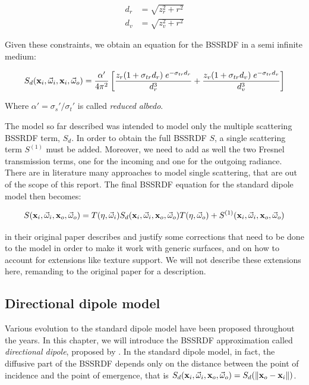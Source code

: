 \begin{equation*}
\begin{split}
d_r &= \sqrt{z_r^2 + r^2} \\
d_v &= \sqrt{z_v^2 + r^2}
\end{split}
\end{equation*}

Given these constraints, we obtain an equation for the BSSRDF in a semi infinite medium:

$$
S_d(\mathbf{x}_i,\vec{\omega}_i,\mathbf{x}_i,\vec{\omega}_o) = \frac{\alpha'}{4 \pi^2} \left[\frac{z_r (1 + \sigma_{tr} d_r) \; e^{-\sigma_{tr} d_r}}{d_r^3} + \frac{z_v (1 + \sigma_{tr} d_v) \; e^{-\sigma_{tr} d_v}}{d_v^3} \right]
$$

Where $\alpha' = \sigma_s' / \sigma_t'$ is called \emph{reduced albedo}.

The model so far described was intended to model only the multiple scattering BSSRDF term, $S_d$. In order to obtain the full BSSRDF $S$, a single scattering term $S^{(1)}$ must be added. Moreover, we need to add as well the two Fresnel transmission terms, one for the incoming and one for the outgoing radiance. There are in literature many approaches to model single scattering, that are out of the scope of this report. The final BSSRDF equation for the standard dipole model then becomes:

$$
S(\mathbf{x}_i, \vec{\omega}_i, \mathbf{x}_o, \vec{\omega}_o) = T(\eta,\vec{\omega}_i) S_d(\mathbf{x}_i, \vec{\omega}_i, \mathbf{x}_o, \vec{\omega}_o) T(\eta,\vec{\omega}_o) + S^{(1)}(\mathbf{x}_i, \vec{\omega}_i, \mathbf{x}_o, \vec{\omega}_o)
$$

\cite{Jensen:2001:PMS:383259.383319} in their original paper describes and justify some corrections that need to be done to the model in order to make it work with generic surfaces, and on how to account for extensions like texture support. We will not describe these extensions here, remanding to the original paper for a description.

\subsection{Directional dipole model}
 
Various evolution to the standard dipole model have been proposed throughout the years. In this chapter, we will introduce the BSSRDF approximation called \emph{directional dipole}, proposed by \cite{IMM2013-06646}. In the standard dipole model, in fact, the diffusive part of the BSSRDF depends only on the distance between the point of incidence and the point of emergence, that is $S_d(\mathbf{x}_i, \vec{\omega}_i, \mathbf{x}_o, \vec{\omega}_o) = S_d(\|\mathbf{x}_o - \mathbf{x}_i\|)$. 

